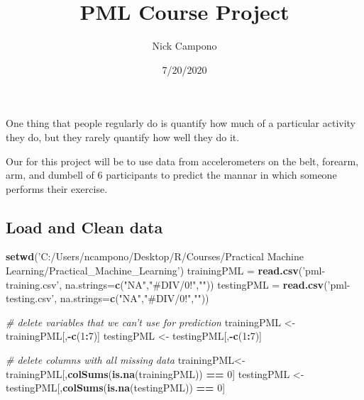 \documentclass[
]{article}
\title{PML Course Project}
\author{Nick Campono}
\date{7/20/2020}
\newenvironment{Shaded}{\begin{snugshade}}{\end{snugshade}}
\newcommand{\CommentTok}[1]{\textcolor[rgb]{0.56,0.35,0.01}{\textit{#1}}}
\newcommand{\DataTypeTok}[1]{\textcolor[rgb]{0.13,0.29,0.53}{#1}}
\newcommand{\DecValTok}[1]{\textcolor[rgb]{0.00,0.00,0.81}{#1}}
\newcommand{\KeywordTok}[1]{\textcolor[rgb]{0.13,0.29,0.53}{\textbf{#1}}}
\newcommand{\NormalTok}[1]{#1}
\newcommand{\OperatorTok}[1]{\textcolor[rgb]{0.81,0.36,0.00}{\textbf{#1}}}
\newcommand{\StringTok}[1]{\textcolor[rgb]{0.31,0.60,0.02}{#1}}
\begin{document}
\maketitle

One thing that people regularly do is quantify how much of a particular
activity they do, but they rarely quantify how well they do it.

Our for this project will be to use data from accelerometers on the
belt, forearm, arm, and dumbell of 6 participants to predict the mannar
in which someone performs their exercise.

\hypertarget{load-and-clean-data}{%
\subsection{Load and Clean data}\label{load-and-clean-data}}

\begin{Shaded}
\begin{Highlighting}[]
\KeywordTok{setwd}\NormalTok{(}\StringTok{'C:/Users/ncampono/Desktop/R/Courses/Practical Machine Learning/Practical_Machine_Learning'}\NormalTok{)}
\NormalTok{trainingPML =}\StringTok{ }\KeywordTok{read.csv}\NormalTok{(}\StringTok{'pml-training.csv'}\NormalTok{, }\DataTypeTok{na.strings=}\KeywordTok{c}\NormalTok{(}\StringTok{"NA"}\NormalTok{,}\StringTok{"#DIV/0!"}\NormalTok{,}\StringTok{""}\NormalTok{))}
\NormalTok{testingPML =}\StringTok{ }\KeywordTok{read.csv}\NormalTok{(}\StringTok{'pml-testing.csv'}\NormalTok{, }\DataTypeTok{na.strings=}\KeywordTok{c}\NormalTok{(}\StringTok{"NA"}\NormalTok{,}\StringTok{"#DIV/0!"}\NormalTok{,}\StringTok{""}\NormalTok{))}

\CommentTok{# delete variables that we can't use for prediction}
\NormalTok{trainingPML <-}\StringTok{ }\NormalTok{trainingPML[,}\OperatorTok{-}\KeywordTok{c}\NormalTok{(}\DecValTok{1}\OperatorTok{:}\DecValTok{7}\NormalTok{)]}
\NormalTok{testingPML <-}\StringTok{ }\NormalTok{testingPML[,}\OperatorTok{-}\KeywordTok{c}\NormalTok{(}\DecValTok{1}\OperatorTok{:}\DecValTok{7}\NormalTok{)]}


\CommentTok{# delete columns with all missing data}
\NormalTok{trainingPML<-trainingPML[,}\KeywordTok{colSums}\NormalTok{(}\KeywordTok{is.na}\NormalTok{(trainingPML)) }\OperatorTok{==}\StringTok{ }\DecValTok{0}\NormalTok{]}
\NormalTok{testingPML <-testingPML[,}\KeywordTok{colSums}\NormalTok{(}\KeywordTok{is.na}\NormalTok{(testingPML)) }\OperatorTok{==}\StringTok{ }\DecValTok{0}\NormalTok{]}
\end{Highlighting}
\end{Shaded}
\end{document}
